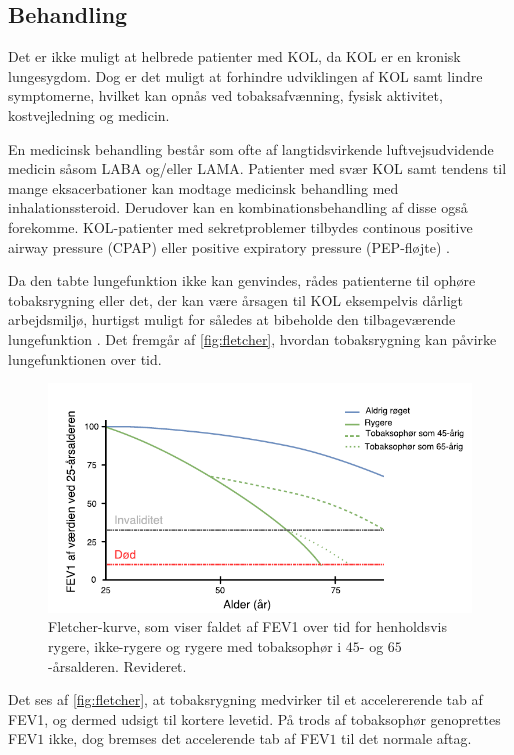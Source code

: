 \subsection{Behandling} \label{sec:behandling}
Det er ikke muligt at helbrede patienter med KOL, da KOL er en kronisk lungesygdom. Dog er det muligt at forhindre udviklingen af KOL samt lindre symptomerne, hvilket kan opnås ved tobaksafvænning, fysisk aktivitet, kostvejledning og medicin.\cite{Basisbogen2016} 


En medicinsk behandling består som ofte af langtidsvirkende luftvejsudvidende medicin såsom LABA og/eller LAMA. Patienter med svær KOL samt tendens til mange eksacerbationer kan modtage medicinsk behandling med inhalationssteroid. Derudover kan en kombinationsbehandling af disse også forekomme.\cite{Sundhedsdatastyrelsen2015} KOL-patienter med sekretproblemer tilbydes continous positive airway pressure (CPAP) eller positive expiratory pressure (PEP-fløjte) \cite{Basisbogen2016}.


Da den tabte lungefunktion ikke kan genvindes, rådes patienterne til ophøre tobaksrygning eller det, der kan være årsagen til KOL eksempelvis dårligt arbejdsmiljø, hurtigst muligt for således at bibeholde den tilbageværende lungefunktion \cite{Basisbogen2016}. Det fremgår af \autoref{fig:fletcher}, hvordan tobaksrygning kan påvirke lungefunktionen over tid. 

\begin{figure} [H]
\centering
\includegraphics[width=1\textwidth]{figures/fletcher}
\caption{Fletcher-kurve, som viser faldet af FEV1 over tid for henholdsvis rygere, ikke-rygere og rygere med tobaksophør i $45$- og $65$-årsalderen. Revideret\cite{Basisbogen2016}.}
\label{fig:fletcher}
\end{figure} 

\noindent
Det ses af \autoref{fig:fletcher}, at tobaksrygning medvirker til et accelererende tab af FEV1, og dermed udsigt til kortere levetid. På trods af tobaksophør genoprettes FEV$1$ ikke, dog bremses det accelerende tab af FEV$1$ til det normale aftag.\cite{dsam2016}

